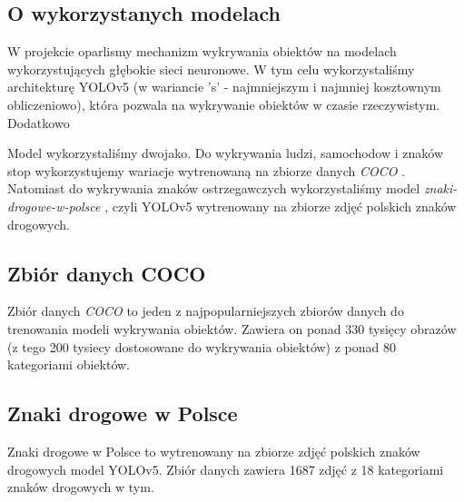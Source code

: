 \subsection*{O wykorzystanych modelach}
W projekcie oparlismy mechanizm wykrywania obiektów na modelach wykorzystujących głębokie sieci neuronowe. 
W tym celu wykorzystaliśmy architekturę YOLOv5 (w wariancie 's' - najmniejszym i najmniej kosztownym
obliczeniowo), 
która pozwala na wykrywanie obiektów w czasie rzeczywistym. Dodatkowo 

Model wykorzystaliśmy dwojako. 
Do wykrywania ludzi, samochodow i znaków stop wykorzystujemy wariacje wytrenowaną na zbiorze danych
\textit{COCO} \citep[zobacz:][]{COCO}. Natomiast do wykrywania znaków ostrzegawczych wykorzystaliśmy model
\textit{znaki-drogowe-w-polsce} \citep[zobacz:][]{ZnakiWPolsce}, czyli YOLOv5 wytrenowany na zbiorze zdjęć
polskich znaków drogowych.

\subsection*{Zbiór danych COCO}
Zbiór danych \textit{COCO} to jeden z najpopularniejszych zbiorów danych do trenowania modeli wykrywania
obiektów.
Zawiera on ponad 330 tysięcy obrazów (z tego 200 tysiecy dostosowane do wykrywania obiektów) 
z ponad 80 kategoriami obiektów.

\subsection*{Znaki drogowe w Polsce}
Znaki drogowe w Polsce \citep[zobacz:][]{ZnakiWPolsce} to wytrenowany na zbiorze zdjęć polskich znaków drogowych model YOLOv5.
Zbiór danych zawiera 1687 zdjęć z 18 kategoriami znaków drogowych w tym.